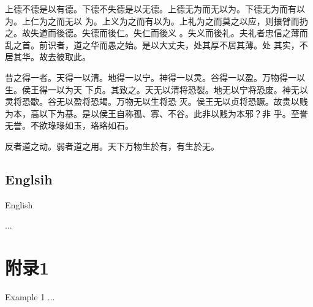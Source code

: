 \documentclass[a4paper, twoside, openany, extrafontsizes]{dlutthesis}
\begin{document}
上德不德是以有德。下德不失德是以无德。上德无为而无以为。下德无为而有以为。上仁为之而无以
为。上义为之而有以为。上礼为之而莫之以应，则攘臂而扔之。故失道而後德。失德而後仁。失仁而後义
。失义而後礼。夫礼者忠信之薄而乱之首。前识者，道之华而愚之始。是以大丈夫，处其厚不居其薄。处
其实，不居其华。故去彼取此。

昔之得一者。天得一以清。地得一以宁。神得一以灵。谷得一以盈。万物得一以生。侯王得一以为天
下贞。其致之。天无以清将恐裂。地无以宁将恐废。神无以灵将恐歇。谷无以盈将恐竭。万物无以生将恐
灭。侯王无以贞将恐蹶。故贵以贱为本，高以下为基。是以侯王自称孤、寡、不谷。此非以贱为本邪？非
乎。至誉无誉。不欲琭琭如玉，珞珞如石。

反者道之动。弱者道之用。天下万物生於有，有生於无。

\section{Englsih}{English}
\label{sec:englsih}

\lipsum[1-9]


\printpagenotes

\begin{thebibliography}
	...
\end{thebibliography}

\appendix
\chapter{附录1}{Example 1}
...

\backmatter
\end{document}
